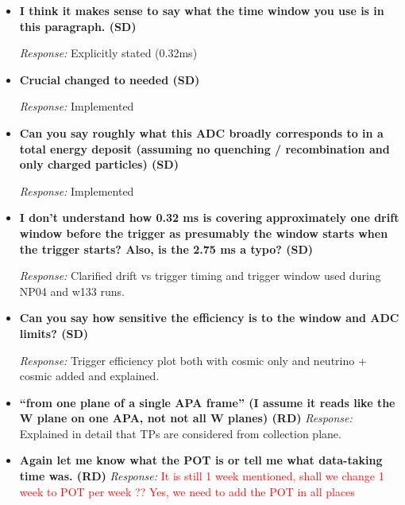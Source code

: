 \documentclass[11pt]{article}
\begin{document}
\begin{itemize}[leftmargin=*]

\item \textbf{I think it makes sense to say what the time window you use is in this paragraph. (SD)}

\textit{Response:} Explicitly stated (0.32ms)


\item \textbf{Crucial changed to needed (SD)}

\textit{Response:} Implemented


\item \textbf{Can you say roughly what this ADC broadly corresponds to in a total energy deposit (assuming no quenching / recombination and only charged particles) (SD)}

\textit{Response:} Implemented


\item \textbf{I don’t understand how 0.32 ms is covering approximately one drift window before the
trigger as presumably the window starts when the trigger starts? Also, is the 2.75 ms a typo? (SD)}

\textit{Response:} Clarified drift vs trigger timing and trigger window used during NP04 and w133 runs.


\item \textbf{Can you say how sensitive the efficiency is to the window and ADC limits? (SD)}

\textit{Response:} Trigger efficiency plot both with cosmic only and neutrino + cosmic added and explained.

\item \textbf{“from one plane of a single APA frame” (I assume it reads like the W plane on one
APA, not not all W planes) (RD)}
\textit{Response:} Explained in detail that TPs are considered from collection plane.

\item \textbf{Again let me know what the POT is or tell me what data-taking time was. (RD)}
\textit{Response:} \textcolor{red}{It is still 1 week mentioned, shall we change 1 week to POT per week ?? Yes, we need to add the POT in all places}


\end{itemize}
\end{document}

